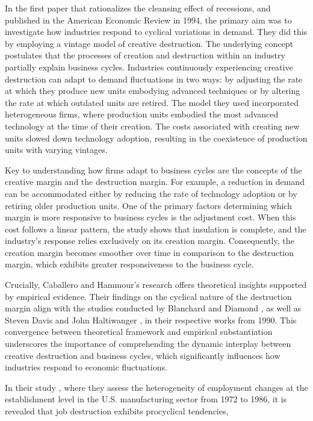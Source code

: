 \documentclass[12pt]{report}
\begin{document}
In the first paper that rationalizes the cleansing effect of recessions, \cite{CabHarm94} and published in the American
Economic Review in 1994, the primary aim was to investigate how
industries respond to cyclical variations in demand. They did this by employing a vintage model of creative destruction.
The underlying concept postulates that the processes of creation and destruction within an industry partially explain
business cycles. Industries continuously experiencing creative destruction can adapt to demand fluctuations in two
ways: by adjusting the rate at which they produce new units embodying advanced techniques or by altering the
rate at which outdated units are retired. The model they used incorporated heterogeneous firms, where production units
embodied the most advanced technology at the time of their creation. The costs associated with creating new units
slowed down technology adoption, resulting in the coexistence of production units with varying vintages.
\par
Key to understanding how firms adapt to business cycles are the concepts of the creative margin and the destruction
margin. For example, a reduction in demand can be accommodated either by reducing the rate of technology adoption or by
retiring older production units. One of the primary factors determining which margin is more responsive to business
cycles is the adjustment cost. When this cost follows a linear pattern, the study shows that insulation is complete, and
the industry's response relies exclusively on its creation margin. Consequently, the creation margin becomes smoother
over time in comparison to the destruction margin, which exhibits greater responsiveness to the business cycle.
\par
Crucially, Caballero and Hammour's research \cite{BlaDia90} offers theoretical insights supported by empirical
evidence. Their findings on the cyclical nature of the destruction margin align with the studies conducted by Blanchard
and Diamond \cite{BlaDia90}, as well as Steven Davis and John Haltiwanger \cite{DavHalt92}, in their respective works
from 1990. This
convergence between theoretical framework and empirical substantiation underscores the importance of comprehending the
dynamic interplay between creative destruction and business cycles, which significantly influences how industries
respond to economic fluctuations.
\par
In their study \cite{DavHalt92}, where they assess the heterogeneity of employment changes at the establishment level in
the U.S. manufacturing sector from 1972 to 1986, it is revealed that job destruction exhibits procyclical tendencies,
\end{document}
